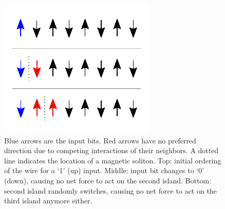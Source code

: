 \documentclass[12pt,a4paper]{article}
\begin{document}
\begin{figure}
    \centering
    \includegraphics[width=0.5\columnwidth]{Figures/Introduction/Soliton_random_walk_2steps.pdf}
    \caption{Blue arrows are the input bits. Red arrows have no preferred direction due to competing interactions of their neighbors. A dotted line indicates the location of a magnetic soliton. Top: initial ordering of the wire for a `1' (up) input. Middle: input bit changes to `0' (down), causing no net force to act on the second island. Bottom: second island randomly switches, causing no net force to act on the third island anymore either.}
    \label{fig:Intro_SolitonRandomWalk}
\end{figure}
\end{document}
